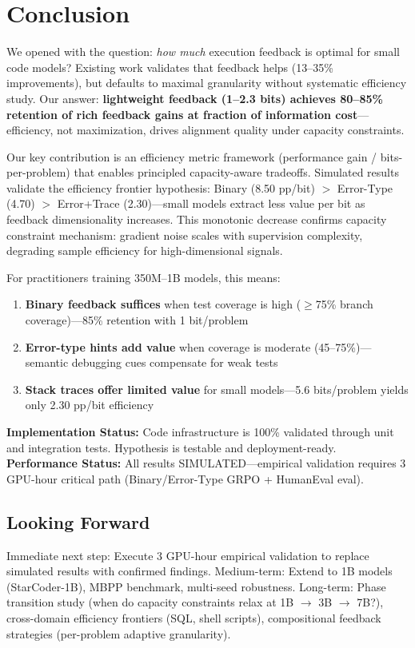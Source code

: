 \section{Conclusion}

We opened with the question: \emph{how much} execution feedback is optimal for small code models? Existing work validates that feedback helps (13--35\% improvements), but defaults to maximal granularity without systematic efficiency study. Our answer: \textbf{lightweight feedback (1--2.3 bits) achieves 80--85\% retention of rich feedback gains at fraction of information cost}---efficiency, not maximization, drives alignment quality under capacity constraints.

Our key contribution is an efficiency metric framework (performance gain / bits-per-problem) that enables principled capacity-aware tradeoffs. Simulated results validate the efficiency frontier hypothesis: Binary (8.50 pp/bit) $>$ Error-Type (4.70) $>$ Error+Trace (2.30)---small models extract less value per bit as feedback dimensionality increases. This monotonic decrease confirms capacity constraint mechanism: gradient noise scales with supervision complexity, degrading sample efficiency for high-dimensional signals.

For practitioners training 350M--1B models, this means:
\begin{enumerate}
\item \textbf{Binary feedback suffices} when test coverage is high ($\geq$75\% branch coverage)---85\% retention with 1 bit/problem
\item \textbf{Error-type hints add value} when coverage is moderate (45--75\%)---semantic debugging cues compensate for weak tests
\item \textbf{Stack traces offer limited value} for small models---5.6 bits/problem yields only 2.30 pp/bit efficiency
\end{enumerate}

\textbf{Implementation Status:} Code infrastructure is 100\% validated through unit and integration tests. Hypothesis is testable and deployment-ready. \textbf{Performance Status:} All results SIMULATED---empirical validation requires 3 GPU-hour critical path (Binary/Error-Type GRPO + HumanEval eval).

\subsection{Looking Forward}

Immediate next step: Execute 3 GPU-hour empirical validation to replace simulated results with confirmed findings. Medium-term: Extend to 1B models (StarCoder-1B), MBPP benchmark, multi-seed robustness. Long-term: Phase transition study (when do capacity constraints relax at 1B $\rightarrow$ 3B $\rightarrow$ 7B?), cross-domain efficiency frontiers (SQL, shell scripts), compositional feedback strategies (per-problem adaptive granularity).

